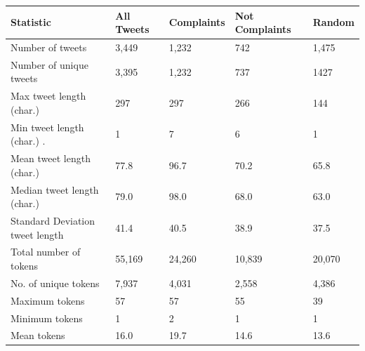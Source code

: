 \begin{table}[htbp]
    \captionsetup{font=small}
    \centering
    \begin{tabularx}{\textwidth}{|l|X|X|X|X|}
        \hline
        \rowcolor[gray]{0.7}
        \textbf{Statistic}              & \textbf{All Tweets} & \textbf{Complaints} & \textbf{Not Complaints} & \textbf{Random} \\
        \hline
        Number of tweets                & 3,449               & 1,232               & 742                     & 1,475           \\
        \hline
        Number of unique tweets         & 3,395               & 1,232               & 737                     & 1427            \\
        \hline
        \hline
        Max tweet length (char.)        & 297                 & 297                 & 266                     & 144             \\
        \hline
        Min tweet length (char.)   .    & 1                   & 7                   & 6                       & 1               \\
        \hline
        Mean tweet length (char.)       & 77.8                & 96.7                & 70.2                    & 65.8            \\
        \hline
        Median tweet length (char.)     & 79.0                & 98.0                & 68.0                    & 63.0            \\
        \hline
        Standard Deviation tweet length & 41.4                & 40.5                & 38.9                    & 37.5            \\
        \hline
        \hline
        Total number of tokens          & 55,169              & 24,260              & 10,839                  & 20,070          \\
        \hline
        No. of unique tokens            & 7,937               & 4,031               & 2,558                   & 4,386           \\
        \hline
        Maximum tokens                  & 57                  & 57                  & 55                      & 39              \\
        \hline
        Minimum tokens                  & 1                   & 2                   & 1                       & 1               \\
        \hline
        Mean tokens                     & 16.0                & 19.7                & 14.6                    & 13.6            \\

\end{tabularx}
\end{table}
